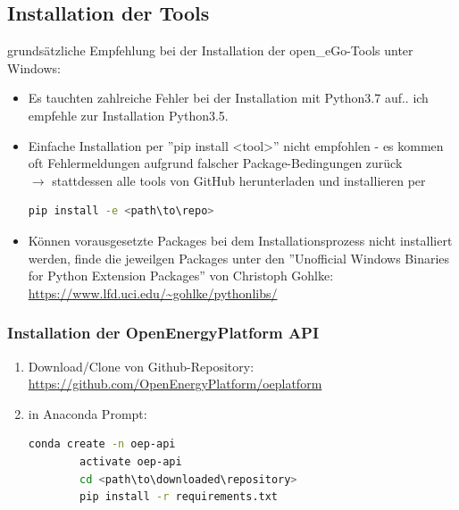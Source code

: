 \documentclass[
a4paper,     %
12pt         %
]{scrartcl}  %
\begin{document}
\subsection{Installation der Tools}
grundsätzliche Empfehlung bei der Installation der open\_eGo-Tools unter Windows:
\begin{itemize}
\item Es tauchten zahlreiche Fehler bei der Installation mit Python3.7 auf.. ich empfehle zur Installation Python3.5.
\item Einfache Installation per ''pip install <tool>'' nicht empfohlen - es kommen oft Fehlermeldungen aufgrund falscher Package-Bedingungen zurück\\
$\rightarrow$ stattdessen alle tools von GitHub herunterladen und installieren per
 \begin{lstlisting}[language=bash]
 pip install -e <path\to\repo>
 \end{lstlisting}

\item Können vorausgesetzte Packages bei dem Installationsprozess nicht installiert werden, finde die jeweilgen Packages unter den ''Unofficial Windows Binaries for Python Extension Packages'' von Christoph Gohlke:
\url{https://www.lfd.uci.edu/~gohlke/pythonlibs/}
\end{itemize}

\subsubsection{Installation der OpenEnergyPlatform API}
\begin{enumerate}
	\item Download/Clone von Github-Repository: \url{https://github.com/OpenEnergyPlatform/oeplatform}
	\item in Anaconda Prompt:
	\begin{lstlisting}[language=bash]
		conda create -n oep-api
		activate oep-api
		cd <path\to\downloaded\repository>
		pip install -r requirements.txt
	\end{lstlisting}
\end{enumerate}
\end{document}
